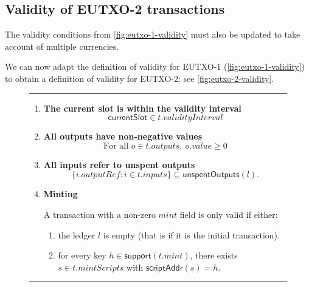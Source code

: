 \documentclass[a4paper]{article}
\renewcommand{\i}{\textit}  %
\newcommand{\msf}[1]{\ensuremath{\mathsf{#1}}}
\newcommand{\mi}[1]{\ensuremath{\mathit{#1}}}
\newcommand\rfskip{7pt}
\newenvironment{ruledfigure}[1]{\begin{figure}[#1]\hrule\vspace{\rfskip}}{\vspace{\rfskip}\hrule\end{figure}}
\newcommand{\support}{\msf{support}}
\newcommand{\scriptAddr}{\msf{scriptAddr}}
\newcommand{\inputs}{\mi{inputs}}
\newcommand{\outputs}{\mi{outputs}}
\newcommand{\mint}{\mi{mint}}
\newcommand{\mintScripts}{\mi{mintScripts}}
\newcommand{\val}{\mi{value}}  %
\newcommand{\outputref}{\mi{outputRef}}
\newcommand{\unspent}{\msf{unspentOutputs}}
\begin{document}
\subsection{Validity of EUTXO-2 transactions}
\label{sec:eutxo-2-validity}

\bigskip
\noindent The validity conditions from
\cref{fig:eutxo-1-validity} must also be updated to take account
of multiple currencies.

We can now adapt the definition of validity for EUTXO-1
(\cref{fig:eutxo-1-validity}) to obtain a definition of validity for
EUTXO-2: see \cref{fig:eutxo-2-validity}.

\begin{ruledfigure}{H}
\begin{enumerate}

\item
  \label{rule:slot-in-range-2}
  \textbf{The current slot is within the validity interval}
  \begin{displaymath}
    \msf{currentSlot} \in t.\i{validityInterval}
  \end{displaymath}

\item
  \label{rule:all-outputs-are-non-negative-2}
  \textbf{All outputs have non-negative values}
  \begin{displaymath}
    \textrm{For all } o \in t.\outputs,\ o.\val \geq 0
  \end{displaymath}

\item
  \label{rule:all-inputs-refer-to-unspent-outputs-2}
  \textbf{All inputs refer to unspent outputs}
  \begin{displaymath}
    \{i.\outputref: i \in t.\inputs \} \subseteq \unspent(l).
  \end{displaymath}

\item
  \label{rule:minting-2}
  \textbf{Minting}

  A transaction with a non-zero \mint{} field is only
  valid if either:
  \begin{enumerate}
    \item the ledger $l$ is empty (that is if it is the initial transaction).
    \item \label{rule:custom-mint}
      for every key $h \in \support(t.\mint)$, there
      exists $s \in t.\mintScripts$ with $\scriptAddr(s) = h$.
  \end{enumerate}


\end{enumerate}
\end{ruledfigure}
\end{document}
